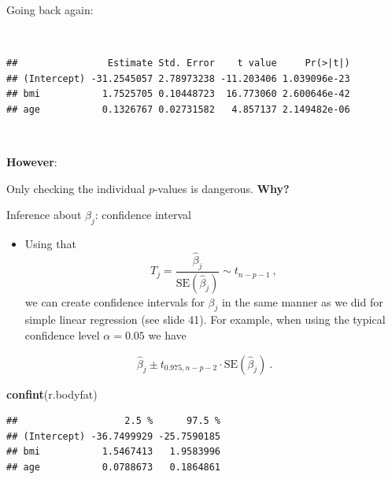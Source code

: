 \documentclass[
  10pt,
  ignorenonframetext,
]{beamer}
\newenvironment{Shaded}{\begin{snugshade}}{\end{snugshade}}
\newcommand{\FunctionTok}[1]{\textcolor[rgb]{0.13,0.29,0.53}{\textbf{#1}}}
\newcommand{\NormalTok}[1]{#1}
\newcommand{\SpecialCharTok}[1]{\textcolor[rgb]{0.81,0.36,0.00}{\textbf{#1}}}
\providecommand{\tightlist}{%
  \setlength{\itemsep}{0pt}\setlength{\parskip}{0pt}}
\begin{document}
\begin{frame}[fragile]
Going back again:

\(~\)

\footnotesize

\begin{Shaded}
\end{Shaded}

\begin{verbatim}
##                Estimate Std. Error    t value     Pr(>|t|)
## (Intercept) -31.2545057 2.78973238 -11.203406 1.039096e-23
## bmi           1.7525705 0.10448723  16.773060 2.600646e-42
## age           0.1326767 0.02731582   4.857137 2.149482e-06
\end{verbatim}

\normalsize

\(~\)

\textbf{However}:

Only checking the individual \(p\)-values is dangerous. \textbf{Why?}\\
\end{frame}

\begin{frame}[fragile]
\begin{block}{Inference about \(\beta_j\): confidence interval}
\protect\hypertarget{inference-about-beta_j-confidence-interval}{}
\(~\)

\begin{itemize}
\tightlist
\item
  Using that
  \[ T_j=\frac{\hat{\beta}_j}{\text{SE}(\hat\beta_j)}\sim t_{n-p-1} \ ,\]
  we can create confidence intervals for \(\beta_j\) in the same manner
  as we did for simple linear regression (see slide 41). For example,
  when using the typical confidence level \(\alpha=0.05\) we have
\end{itemize}

\[\hat{\beta}_j \pm t_{0.975,n-p-2} \cdot\text{SE} (\hat{\beta}_j)  \ .\]

\vspace{4mm}

\footnotesize

\begin{Shaded}
\begin{Highlighting}[]
\FunctionTok{confint}\NormalTok{(r.bodyfat)}
\end{Highlighting}
\end{Shaded}

\begin{verbatim}
##                   2.5 %      97.5 %
## (Intercept) -36.7499929 -25.7590185
## bmi           1.5467413   1.9583996
## age           0.0788673   0.1864861
\end{verbatim}
\end{block}
\end{frame}
\end{document}
